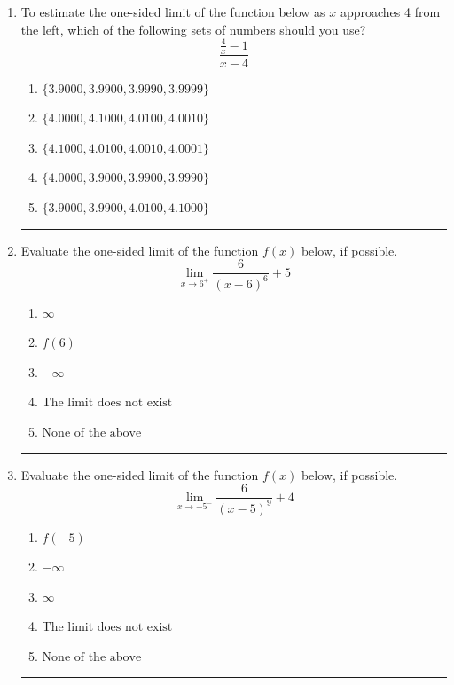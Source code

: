 \documentclass[14pt]{extbook}
\newcommand{\litem}[1]{\item#1\hspace*{-1cm}\rule{\textwidth}{0.4pt}}
\begin{document}
\begin{enumerate}
\litem{
To estimate the one-sided limit of the function below as $x$ approaches 4 from the left, which of the following sets of numbers should you use?\[ \frac{\frac{4}{x} - 1}{x - 4} \]\begin{enumerate}[label=\Alph*.]
\item \( \{ 3.9000, 3.9900, 3.9990, 3.9999 \} \)
\item \( \{ 4.0000, 4.1000, 4.0100, 4.0010 \} \)
\item \( \{ 4.1000, 4.0100, 4.0010, 4.0001 \} \)
\item \( \{ 4.0000, 3.9000, 3.9900, 3.9990 \} \)
\item \( \{ 3.9000, 3.9900, 4.0100, 4.1000 \} \)

\end{enumerate} }
\litem{
Evaluate the one-sided limit of the function $f(x)$ below, if possible.\[ \lim_{x \rightarrow 6^+} \frac{6}{(x-6)^6}+5 \]\begin{enumerate}[label=\Alph*.]
\item \( \infty \)
\item \( f(6) \)
\item \( -\infty \)
\item \( \text{The limit does not exist} \)
\item \( \text{None of the above} \)

\end{enumerate} }
\litem{
Evaluate the one-sided limit of the function $f(x)$ below, if possible.\[ \lim_{x \rightarrow -5^-} \frac{6}{(x-5)^9}+4 \]\begin{enumerate}[label=\Alph*.]
\item \( f(-5) \)
\item \( -\infty \)
\item \( \infty \)
\item \( \text{The limit does not exist} \)
\item \( \text{None of the above} \)


\end{enumerate}}
\end{enumerate}
\end{document}

